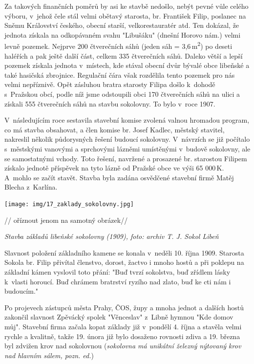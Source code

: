 \documentclass[a5paper, 11pt, twoside]{article}
\begin{document}
Za takových finančních poměrů by asi ke stavbě nedošlo, nebýt pevné vůle
celého výboru, v~jehož čele stál velmi obětavý starosta, br. František
Filip, poslanec na Sněmu Království českého, obecní starší,
velkorestauratér atd. Ten dokázal, že jednota získala na odkopávaném
svahu "Libušáku" (dnešní Horovo nám.) velmi levně pozemek. Nejprve 200
čtverečních sáhů (jeden sáh = 3,6\,m\textsuperscript{2}) po deseti
haléřích a pak ještě další část, celkem 335 čtverečních sáhů. Daleko
větší a lepší pozemek získala jednota v~místech, kde stával obecní dvůr
bývalé obce libeňské a také hasičská zbrojnice. Regulační čára však
rozdělila tento pozemek pro nás velmi nepříznivě. Opět zásluhou bratra
starosty Filipa došlo k~dohodě s~Pražskou obcí, podle níž jsme
odstoupili obci 170 čtverečních sáhů na ulici a získali 555 čtverečních
sáhů na stavbu sokolovny. To bylo v~roce 1907.

V~následujícím roce sestavila stavební komise zvolená valnou hromadou
program, co má stavba obsahovat, a člen komise br. Josef Kadlec, městský
stavitel, nakreslil několik půdorysných řešení budoucí sokolovny.
V~návrzích se již počítalo s~městskými vanovými a sprchovými lázněmi
umístěnými v~budově sokolovny, ale se samostatnými vchody. Toto řešení,
navržené a prosazené br. starostou Filipem získalo jednotě příspěvek na
tyto lázně od Pražské obce ve výši 65 000\,K. A~mohlo se začít stavět.
Stavba byla zadána osvědčené stavební firmě Matěj Blecha z~Karlína.

 \texttt{[image: img/17\_zaklady\_sokolovny.jpg]}

// oříznout jenom na samotný obrázek//

\textit{Stavba základů libeňské sokolovny (1909), foto: archiv T. J. Sokol
Libeň}

Slavnost položení základního kamene se konala v~neděli 10. října 1909.
Starosta Sokola br. Filip přivítal členstvo, dorost, žactvo i mnoho
hostů a při poklepu na základní kámen vyslovil toto přání: "Buď tvrzí
sokolstva, buď zřídlem lásky k~vlasti horoucí. Buď chrámem bratrství
ryzího nad zlato, buď ke cti nám i budoucím."

Po projevech zástupců města Prahy, ČOS, župy a mnoha jednot a dalších
hostů zakončil slavnost Zpěvácký spolek "Věnceslav" z~Libně hymnou "Kde
domov můj". Stavební firma začala kopat základy již v~pondělí 4. října
a stavěla velmi rychle a kvalitně, takže 19. února již bylo dosaženo
rovnosti zdiva a 19. března byl zdvižen krov nad sokolovnou
(\textit{sokolovna má unikátní železný nýtovaný krov nad hlavním sálem,
pozn. ed.})
\end{document}
